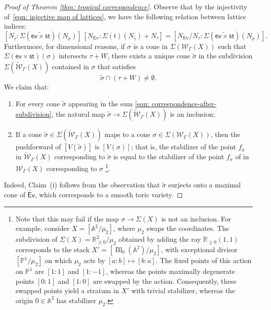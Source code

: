\documentclass{article}
\def\Ev{{\mathsf{Ev}}}
\begin{document}
\begin{proof}[Proof of  Theorem \ref{thm: tropical correspondence}]
Observe that by the injectivity of~\eqref{eqn: injective map of lattices}, we have the following relation between lattice indices:
\[
[  N_{\widetilde{\tau}}: \Sigma(\widetilde{\mathsf{ev} \times \mathsf{st}})( N_{\widetilde{\sigma}})]\,
[  N_{\mathrm{Ev}} :\Sigma(t)( N_{\widetilde{\tau}})+ N_\tau ]
=
[ N_{\mathrm{Ev}}/N_\tau: \Sigma(\widetilde{\mathsf{ev} \times \mathsf{st}})( N_{\widetilde{\sigma}})].
\]
Furthermore, for dimensional reasons, if $\sigma$ is a cone in $\Sigma(\mathcal{W}_\Gamma(X))$ such that $\Sigma(\mathsf{ev} \times \mathsf{st})(\sigma)$ intersects $\tau + W$, there exists a unique cone $\widetilde{\sigma}$ in the subdivision $\Sigma(\widetilde{\mathcal{W}}_{\Gamma}(X))$ contained in $\sigma$ that satisfies
\[
\widetilde{\sigma} \cap (\tau + W) \neq \emptyset.
\]
We claim that:
\begin{enumerate}[label=\textbf{Claim (\roman*)}, leftmargin=*]
    \item For every cone $\widetilde{\sigma}$ appearing in the sum \eqref{eqn: correspondence-after-subdivision}, the natural map $\widetilde{\sigma} \to \Sigma(\widetilde{\mathcal{W}}_{\Gamma}(X))$ is an inclusion;
    \item If a cone $\widetilde{\sigma} \in \Sigma(\widetilde{\mathcal{W}}_\Gamma(X))$ maps to a cone $\sigma \in \Sigma(\mathcal{W}_\Gamma(X))$, then the pushforward of $[V(\widetilde{\sigma})]$ is $[V(\sigma)]$; that is, the stabilizer of the point $f_{\widetilde{\sigma}}$ in $ \widetilde{\mathcal{W}}_\Gamma(X)$ corresponding to $\widetilde{\sigma}$ is equal to the stabilizer of the point $f_\sigma$ of in  $\mathcal{W}_{\Gamma}(X)$ corresponding to $\sigma$ \footnote{Note that this may fail if the map $\sigma \to \Sigma(X)$ is not an inclusion. For example, consider $X = [\mathbb{A}^2/\mu_2]$, where $\mu_2$ swaps the coordinates. The subdivision of $\Sigma(X)= \mathbb{R}_{\geq 0}^2/\mu_2$ obtained by adding the ray $\mathbb{R}_{\ge 0}(1,1)$ corresponds to the stack $X'=[\operatorname{Bl}_0(\mathbb{A}^2)/\mu_2]$, with exceptional divisor $[\mathbb{P}^1/\mu_2]$ on which $\mu_2$ acts by $[a:b] \mapsto [b:a]$. The fixed points of this action on $\mathbb{P}^1$ are $[1:1]$ and $[1:-1]$, whereas the points maximally degenerate points $[0:1]$ and $[1:0]$ are swapped by the action. Consequently, these swapped points yield a stratum in $X'$ with trivial stabilizer, whereas the origin $0 \in \mathbb{A}^2$ has stabilizer $\mu_2$.}.
\end{enumerate}

Indeed, Claim~(i) follows from the observation that $\widetilde{\sigma}$ surjects onto a maximal cone of $\widetilde{\Ev}$, which corresponds to a smooth toric variety. 


\end{proof}
\end{document}
